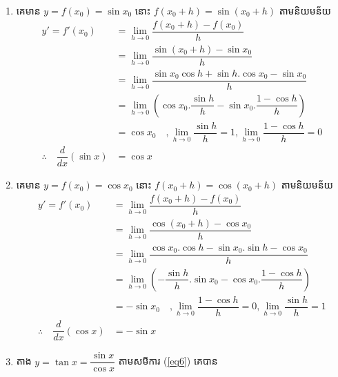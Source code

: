 \documentclass[a4paper,12pt]{article}
\begin{document}
\begin{enumerate}
	\item គេមាន $y=f(x_0)=\sin x_0$ នោះ $f(x_0+h)=\sin (x_0+h)$ តាមនិយមន័យ
	      \begin{align*}
		      y'=f'(x_0)                             & =\lim_{h\to 0}\dfrac{f(x_0+h)-f(x_0)}{h}                                               \\
		                                             & =\lim_{h\to 0}\dfrac{\sin (x_0+h)-\sin x_0}{h}                                         \\
		                                             & =\lim_{h\to 0}\dfrac{\sin x_0\cos h+\sin h.\cos x_0 -\sin x_0}{h}                      \\
		                                             & =\lim_{h\to 0}\left(\cos x_0.\dfrac{\sin h}{h}-\sin x_0.\dfrac{1-\cos h}{h}  \right)   \\
		                                             & =\cos x_0 \quad , \lim_{h\to 0}\dfrac{\sin h}{h}=1, \lim_{h\to 0}\dfrac{1-\cos h}{h}=0 \\
		      \therefore \quad \dfrac{d}{dx}(\sin x) & =\cos x
	      \end{align*}
	\item គេមាន $y=f(x_0)=\cos x_0$ នោះ $f(x_0+h)=\cos (x_0+h)$ តាមនិយមន័យ
	      \begin{align*}
		      y'=f'(x_0)                            & =\lim_{h\to 0}\dfrac{f(x_0+h)-f(x_0)}{h}                                               \\
		                                            & =\lim_{h\to 0}\dfrac{\cos (x_0+h)-\cos x_0}{h}                                         \\
		                                            & =\lim_{h\to 0}\dfrac{\cos x_0.\cos h-\sin x_0 .\sin h-\cos x_0}{h}                     \\
		                                            & =\lim_{h\to 0}\left(-\dfrac{\sin h}{h}.\sin x_0-\cos x_0. \dfrac{1-\cos h}{h} \right)  \\
		                                            & =-\sin x_0 \quad , \lim_{h\to 0}\dfrac{1-\cos h}{h}=0,\lim_{h\to 0}\dfrac{\sin h}{h}=1 \\
		      \therefore\quad \dfrac{d}{dx}(\cos x) & =-\sin x
	      \end{align*}
	\item តាង $y=\tan x=\dfrac{\sin x}{\cos x}$ តាមសមីការ (\ref{eq6}) គេបាន

\end{enumerate}
\end{document}
